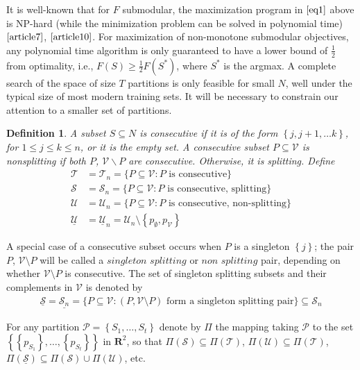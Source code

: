 \documentclass{article}
\newtheorem{definition}{Definition}
\theoremstyle{case}
\begin{document}
It is well-known that for $F$ submodular, the maximization program in $\ref{eq1}$ above is NP-hard (while the minimization problem can be solved in polynomial time) $\cite{article7}$, $\cite{article10}$. For maximization of non-monotone submodular objectives, any polynomial time algorithm is only guaranteed to have a lower bound of $\frac{1}{2}$ from optimality, i.e., $F(S) \geq \frac{1}{2}F(S^{*})$, where $S^*$ is the argmax. A complete search of the space of size $T$ partitions is only feasible for small $N$, well under the typical size of most modern training sets. It will be necessary to constrain our attention to a smaller set of partitions.

\begin{definition}
A subset $S \subseteq N$ is consecutive if it is of the form $\left\lbrace j, j+1, \dots k\right\rbrace$, for $1 \leq j \leq k \leq n$, or it is the empty set. A consecutive subset $P \subseteq \mathcal{V}$ is nonsplitting if both $P$, $\mathcal{V}  \backslash P$ are consecutive. Otherwise, it is splitting. Define
\begin{align*}
\mathcal{T} &= \mathcal{T}_n = \{ P \subseteq \mathcal{V} : P \textrm{ is consecutive} \}\\
\mathcal{S} &= \mathcal{S}_n = \{ P \subseteq \mathcal{V} : P \textrm{ is consecutive, splitting} \} \\
\mathcal{U} &= \mathcal{U}_n = \{ P \subseteq \mathcal{V} : P \textrm{ is consecutive, non-splitting}\} \\
\underline{\mathcal{U}} &= \underline{\mathcal{U}}_n = \mathcal{U}_n \setminus \left\lbrace p_{\emptyset}, p_{\mathcal{V}}\right\rbrace
\end{align*}
\end{definition}


A special case of a consecutive subset occurs when $P$ is a singleton $\left\lbrace j\right\rbrace$; the pair $P$, $\mathcal{V}\setminus P$ will be called a $\textit{singleton splitting}$ or $\textit{non splitting}$ pair, depending on whether $\mathcal{V}\setminus P$ is consecutive. The set of singleton splitting subsets and their complements in $\mathcal{V}$ is denoted by 
\begin{align*}
\mathcal{\underline{S}} = \underline{\mathcal{S}_n}  = \{ P \subseteq \mathcal{V} \colon (P, \mathcal{V} \setminus P) \textrm{ form a singleton splitting pair}\}\subseteq \mathcal{S}_n
\end{align*}

For any partition $\mathcal{P} = \left\lbrace S_1, \dots, S_t\right\rbrace$ denote by $\Pi$ the mapping taking $\mathcal{P}$ to the set $\left\lbrace \left\lbrace p_{S_1}\right\rbrace, \dots, \left\lbrace p_{S_t}\right\rbrace \right\rbrace$ in $\mathbf{R}^2$, so that $\Pi\left( \mathcal{S}\right) \subseteq \Pi\left( \mathcal{T}\right)$, $\Pi\left( \mathcal{U}\right) \subseteq \Pi\left( \mathcal{T}\right)$, $\Pi\left( \mathcal{\underline{S}}\right) \subseteq \Pi\left( \mathcal{S}\right) \cup \Pi\left( \mathcal{U}\right)$, etc.
\end{document}
